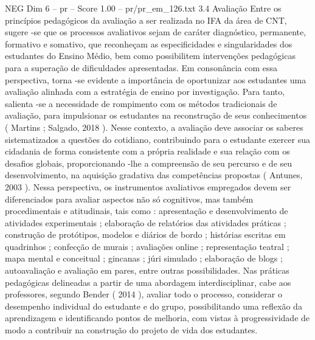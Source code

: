 \begin{textsample}{NEG Dim 6 – pr – Score 1.00 – pr/pr\_em\_126.txt}  \label{ex:f6_neg_268}
3.4 Avaliação Entre os princípios pedagógicos da avaliação a ser realizada no IFA da área de CNT, sugere -se que os processos avaliativos sejam de caráter diagnóstico, permanente, formativo e somativo, que reconheçam as especificidades e singularidades dos estudantes do Ensino Médio, bem como possibilitem intervenções pedagógicas para a superação de dificuldades apresentadas.
Em consonância com essa perspectiva, torna -se evidente a importância de oportunizar aos estudantes uma avaliação alinhada com a estratégia de ensino por investigação.
Para tanto, salienta -se a necessidade de rompimento com os métodos tradicionais de avaliação, para impulsionar os estudantes na reconstrução de seus conhecimentos ( Martins ; Salgado, 2018 ).
Nesse contexto, a avaliação deve associar os saberes sistematizados a questões do cotidiano, contribuindo para o estudante exercer sua cidadania de forma consistente com a própria realidade e sua relação com os desafios globais, proporcionando -lhe a compreensão de seu percurso e de seu desenvolvimento, na aquisição gradativa das competências propostas ( Antunes, 2003 ).
Nessa perspectiva, os instrumentos avaliativos empregados devem ser diferenciados para avaliar aspectos não só cognitivos, mas também procedimentais e atitudinais, tais como : apresentação e desenvolvimento de atividades experimentais ; elaboração de relatórios das atividades práticas ; construção de protótipos, modelos e diários de bordo ; histórias escritas em quadrinhos ; confecção de murais ; avaliações online ; representação teatral ; mapa mental e conceitual ; gincanas ; júri simulado ; elaboração de blogs ; autoavaliação e avaliação em pares, entre outras possibilidades.
Nas práticas pedagógicas delineadas a partir de uma abordagem interdisciplinar, cabe aos professores, segundo Bender ( 2014 ), avaliar todo o processo, considerar o desempenho individual do estudante e do grupo, possibilitando uma reflexão da aprendizagem e identificando pontos de melhoria, com vistas à progressividade de modo a contribuir na construção do projeto de vida dos estudantes.

\end{textsample}
